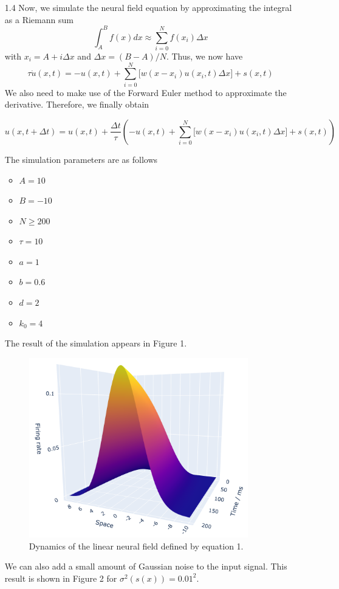 \documentclass[12pt]{article}
\begin{document}
\begin{enumerate}
\item[1.4] Now, we simulate the neural field equation by approximating the integral as a Riemann sum
\[
    \int_{A}^{B}f(x)dx \approx \sum_{i=0}^{N} f(x_{i})\Delta x
\]   
with $x_{i} = A + i\Delta x$ and $\Delta x=(B-A)/N$. Thus, we now have
\[
    \tau \dot{u}(x, t) =   -u(x, t) + \sum_{i=0}^{N} \big[ w(x-x_{i})u(x_{i}, t)\Delta x \big] + s(x, t)
\]
We also need to make use of the Forward Euler method to approximate the derivative. Therefore, we finally obtain

\[
    u(x, t+\Delta t) =  u(x, t) + \frac{\Delta t}{\tau}\left(-u(x, t) + \sum_{i=0}^{N} \big[ w(x-x_{i})u(x_{i}, t)\Delta x \big] + s(x, t)\right)
\]

The simulation parameters are as follows
\begin{itemize}
    \item $A = 10$
    \item $B = -10$
    \item $N \geq 200$
    \item $\tau = 10$
    \item $a = 1$
    \item $b=0.6$
    \item $d=2$
    \item $k_{0}=4$
\end{itemize}
The result of the simulation appears in Figure 1.
\begin{figure}[H]
    \centering
    \includegraphics[width=0.9\textwidth]{./figure1.png}
    \caption{Dynamics of the linear neural field defined by equation 1.}
\end{figure}
We can also add a small amount of Gaussian noise to the input signal. This result is shown in Figure 2 for $\sigma^{2}(s(x))=0.01^2$.

\end{enumerate}
\end{document}
